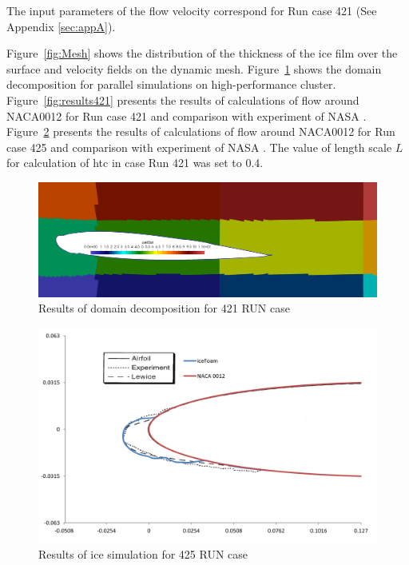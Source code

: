 \documentclass[aerospace,article,submit,moreauthors,pdftex]{Definitions/mdpi}
\begin{document}
The input parameters of the flow velocity correspond for Run case 421 (See Appendix \ref{sec:appA}).

Figure~\ref{fig:Mesh} shows the distribution of the thickness of the ice film over the surface and velocity fields on the dynamic mesh. Figure~\ref{fig:Decomposition} shows the domain decomposition for parallel simulations on high-performance cluster. Figure~\ref{fig:results421} presents the results of calculations of flow around NACA0012 for Run case 421 and comparison with experiment of NASA  \cite{SHINBOND1992,Addy2000IceAA}. Figure~\ref{fig:results425} presents the results of calculations of flow around NACA0012 for Run case 425 and comparison with experiment of NASA \cite{SHINBOND1992,Addy2000IceAA}. The value of length scale $L$ for calculation of htc in case Run 421 was set to 0.4.

\begin{figure}[H]
    \centering
    \includegraphics[scale=0.24]{Figures/421CellDist2.png}
    \caption{Results of domain decomposition for 421 RUN case}
    \label{fig:Decomposition}
\end{figure}

\begin{figure}[H]
    \centering
    \includegraphics[scale=0.37]{Figures/425.png}
    \caption{Results of ice simulation for 425 RUN case}
    \label{fig:results425}
\end{figure}
\end{document}
